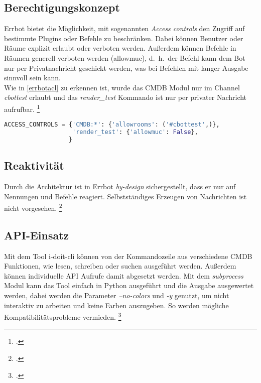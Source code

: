 \subsection{Berechtigungskonzept}
Errbot bietet die Möglichkeit, mit sogenannten \textit{Access controls} den Zugriff auf bestimmte Plugins oder Befehle zu beschränken. Dabei können Benutzer oder Räume explizit erlaubt oder verboten werden. Außerdem können Befehle in Räumen generell verboten werden (allowmuc), d.~h.~der Befehl kann dem Bot nur per Privatnachricht geschickt werden, was bei Befehlen mit langer Ausgabe sinnvoll sein kann.\\
Wie in \autoref{errbotacl} zu erkennen ist, wurde das \acs{CMDB} Modul nur im Channel \textit{cbottest} erlaubt und das \textit{render\_test} Kommando ist nur per privater Nachricht aufrufbar.
\footcite[Vgl.][o. \pno]{errbot_2018_config-template}

\newpage
\begin{lstlisting}[language=python, label=errbotacl, caption=Errbot Access controls]
ACCESS_CONTROLS = {'CMDB:*': {'allowrooms': ('#cbottest',)},
                   'render_test': {'allowmuc': False},
                  }
\end{lstlisting}

\subsection{Reaktivität}
Durch die Architektur ist in Errbot \textit{by-design} sichergestellt, dass er nur auf Nennungen und Befehle reagiert. Selbstständiges Erzeugen von Nachrichten ist nicht vorgesehen.
\footcite[Vgl.][o. \pno]{errbot_2018_mentions}

\subsection{API-Einsatz}
Mit dem Tool i-doit-cli können von der Kommandozeile aus verschiedene \acs{CMDB} Funktionen, wie lesen, schreiben oder suchen ausgeführt werden. Außerdem können individuelle API Aufrufe damit abgesetzt werden. Mit dem \textit{subprocess} Modul kann das Tool einfach in Python ausgeführt und die Ausgabe ausgewertet werden, dabei werden die Parameter \textit{--no-colors} und \textit{-y} genutzt, um nicht interaktiv zu arbeiten und keine Farben auszugeben. So werden mögliche Kompatibilitätsprobleme vermieden.
\footcite[Vgl.][o. \pno]{Heisig_2019_idoitcli}

\newpage
